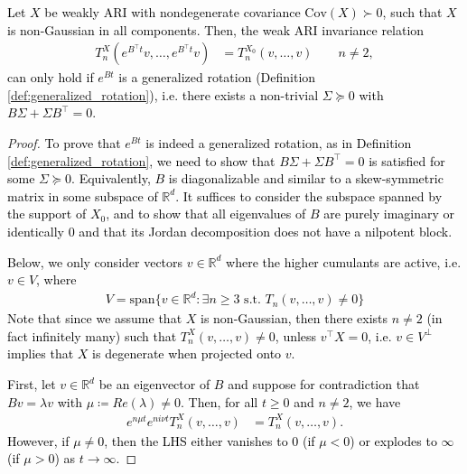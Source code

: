 \documentclass[twoside,11pt]{article}
\newcommand{\R} {\mathbb R}
\newcommand{\cov} {\mathrm{Cov}}
\newcommand{\rv}[1]{\textcolor{black}{#1}}
\begin{document}
\rv{\begin{lemma}
\label{lemma:ARI_implies_generalized_rotation}
Let $X$ be weakly ARI with nondegenerate covariance $\cov(X) \succ 0$, such that $X$ is non-Gaussian in all components. Then, the weak ARI invariance relation 
\begin{align}
T_n^{X}(e^{B^\top t}v, \ldots, e^{B^\top t}v)&=T_n^{X_0}(v, \ldots, v) \qquad n \neq 2,
\end{align}
can only hold if $e^{Bt}$ is a generalized rotation (Definition \ref{def:generalized_rotation}), i.e. there exists a non-trivial $\Sigma \succeq 0$ with $B\Sigma + \Sigma B^\top = 0$.
\end{lemma}}
\begin{proof}
\rv{To prove that $e^{B t}$ is indeed a generalized rotation, as in Definition \ref{def:generalized_rotation}, we need to show that $B\Sigma + \Sigma B^\top = 0$ is satisfied for some $\Sigma \succeq 0$. Equivalently, $B$ is diagonalizable and similar to a skew-symmetric matrix in some subspace of $\R^d$. It suffices to consider the subspace spanned by the support of $X_0$, and to show that all eigenvalues of $B$ are purely imaginary or identically $0$ and that its Jordan decomposition does not have a nilpotent block.}

\rv{Below, we only consider vectors $v \in \R^d$ where the higher cumulants are active, i.e. $v \in V$, where
\begin{align}
    V = \text{span}\{v \in \R^d: \exists n \ge 3 \text{ s.t. } T_n(v, \ldots, v) \neq 0 \}
\end{align}
Note that since we assume that $X$ is non-Gaussian, then there exists $n \neq 2$ (in fact infinitely many) such that $T_n^{X}(v, \ldots, v) \neq 0$, unless $v^\top X = 0$, i.e. $v \in V^\perp$ implies that $X$ is degenerate when projected onto $v$.}

\rv{First, let $v \in \R^d$ be an eigenvector of $B$ and suppose for contradiction that $Bv = \lambda v$ with $\mu \coloneqq Re(\lambda) \neq 0$. Then, for all $t \ge 0$ and $n \neq 2$, we have
\begin{align*}
e^{n\mu t }e^{ni\nu t} T_n^{X}(v, \ldots, v)&=T_n^{X}(v, \ldots, v).
\end{align*}
However, if $\mu \neq 0$, then the LHS either vanishes to $0$ (if $\mu < 0$) or explodes to $\infty$ (if $\mu > 0$) as $t \to \infty$.} 


\end{proof}
\end{document}
